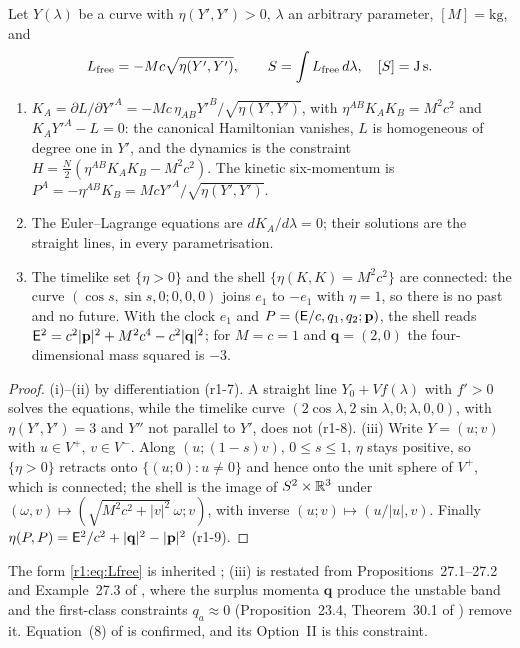 \begin{proposition}
\label{r1:prop:free}
Let $Y(\lambda)$ be a curve with $\eta(Y',Y')>0$, $\lambda$ an arbitrary parameter, $[M]=\mathrm{kg}$, and
\begin{equation}
\label{r1:eq:Lfree}
L_{\rm free}=-Mc\sqrt{\eta(Y',Y')},\qquad S=\int L_{\rm free}\,d\lambda,\quad [S]=\mathrm{J\,s}.
\end{equation}
\begin{enumerate}[label=(\roman*),leftmargin=2.2em]
\item $K_A=\partial L/\partial Y'^A=-Mc\,\eta_{AB}Y'^B/\sqrt{\eta(Y',Y')}$, with $\eta^{AB}K_AK_B=M^2c^2$ and $K_AY'^A-L=0$: the
canonical Hamiltonian vanishes, $L$ is homogeneous of degree one in $Y'$, and the dynamics is the constraint
$H=\tfrac N2(\eta^{AB}K_AK_B-M^2c^2)$. The kinetic six-momentum is $P^A=-\eta^{AB}K_B=McY'^A/\sqrt{\eta(Y',Y')}$.
\item The Euler--Lagrange equations are $dK_A/d\lambda=0$; their solutions are the straight lines, in every parametrisation.
\item The timelike set $\{\eta>0\}$ and the shell $\{\eta(K,K)=M^2c^2\}$ are connected: the curve $(\cos s,\sin s,0;0,0,0)$
joins $e_1$ to $-e_1$ with $\eta=1$, so there is no past and no future. With the clock $e_1$ and $P=(\mathsf E/c,q_1,q_2;\mathbf p)$, the shell reads
$\mathsf E^2=c^2|\mathbf p|^2+M^2c^4-c^2|\mathbf q|^2$; for $M=c=1$ and $\mathbf q=(2,0)$ the four-dimensional mass squared is $-3$.
\end{enumerate}
\end{proposition}

\begin{proof}
(i)--(ii) by differentiation (r1-7). A straight line $Y_0+Vf(\lambda)$ with $f'>0$ solves the equations, while the timelike curve
$(2\cos\lambda,2\sin\lambda,0;\lambda,0,0)$, with $\eta(Y',Y')=3$ and $Y''$ not parallel to $Y'$, does not (r1-8). (iii) Write $Y=(u;v)$
with $u\in V^+$, $v\in V^-$. Along $(u;(1-s)v)$, $0\le s\le1$, $\eta$ stays positive, so $\{\eta>0\}$ retracts onto $\{(u;0):u\neq0\}$
and hence onto the unit sphere of $V^+$, which is connected; the shell is the image of $S^2\times\mathbb{R}^3$ under
$(\omega,v)\mapsto(\sqrt{M^2c^2+|v|^2}\,\omega;v)$, with inverse $(u;v)\mapsto(u/|u|,v)$. Finally $\eta(P,P)=\mathsf
E^2/c^2+|\mathbf q|^2-|\mathbf p|^2$ (r1-9).
\end{proof}

The form \eqref{r1:eq:Lfree} is inherited \cite{LandauLifshitz2}; (iii) is restated from Propositions~27.1--27.2 and Example~27.3 of
\cite{ES17}, where the surplus momenta $\mathbf q$ produce the unstable band and the first-class constraints $q_a\approx0$ (Proposition~23.4,
Theorem~30.1 of \cite{ES17}) remove it. Equation~(8) of \cite{FMB} is confirmed, and its Option~II is this constraint.

